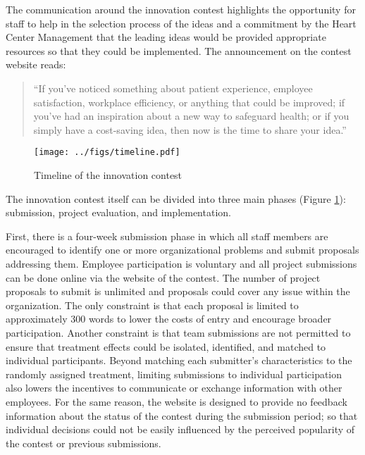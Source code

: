 \documentclass[11pt, titlepage]{article}
\begin{document}
The communication around the innovation contest highlights the
opportunity for staff to help in the selection process of the ideas and
a commitment by the Heart Center Management that the leading ideas would
be provided appropriate resources so that they could be implemented. The
announcement on the contest website reads:

\begin{quote}
``If you've noticed something about patient experience, employee
satisfaction, workplace efficiency, or anything that could be improved;
if you've had an inspiration about a new way to safeguard health; or if
you simply have a cost-saving idea, then now is the time to share your
idea.''
\end{quote}

\begin{figure}
\centering
\caption{Timeline of the innovation contest}
\label{timeline}
\texttt{[image: ../figs/timeline.pdf]}
\end{figure}

The innovation contest itself can be divided into three main phases
(Figure \ref{timeline}): submission, project evaluation, and
implementation.

First, there is a four-week submission phase in which all staff members
are encouraged to identify one or more organizational problems and
submit proposals addressing them. Employee participation is voluntary
and all project submissions can be done online via the website of the
contest. The number of project proposals to submit is unlimited and
proposals could cover any issue within the organization. The only
constraint is that each proposal is limited to approximately 300 words
to lower the costs of entry and encourage broader participation. Another
constraint is that team submissions are not permitted to ensure that
treatment effects could be isolated, identified, and matched to
individual participants. Beyond matching each submitter's
characteristics to the randomly assigned treatment, limiting submissions
to individual participation also lowers the incentives to communicate or
exchange information with other employees. For the same reason, the
website is designed to provide no feedback information about the status
of the contest during the submission period; so that individual
decisions could not be easily influenced by the perceived popularity of
the contest or previous submissions.
\end{document}

